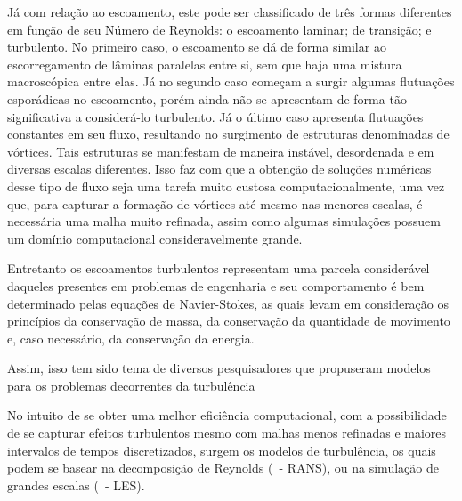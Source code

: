 
Já com relação ao escoamento, este pode ser classificado de três formas diferentes em função de seu Número de Reynolds: o escoamento laminar; de transição; e turbulento. No primeiro caso, o escoamento se dá de forma similar ao escorregamento de lâminas paralelas entre si, sem que haja uma mistura macroscópica entre elas. Já no segundo caso começam a surgir algumas flutuações esporádicas no escoamento, porém ainda não se apresentam de forma tão significativa a considerá-lo turbulento. Já o último caso apresenta flutuações constantes em seu fluxo, resultando no surgimento de estruturas denominadas de vórtices. Tais estruturas se manifestam de maneira instável, desordenada e em diversas escalas diferentes. Isso faz com que a obtenção de soluções numéricas desse tipo de fluxo seja uma tarefa muito custosa computacionalmente, uma vez que, para capturar a formação de vórtices até mesmo nas menores escalas, é necessária uma malha muito refinada, assim como algumas simulações possuem um domínio computacional consideravelmente grande.

Entretanto os escoamentos turbulentos representam uma parcela considerável daqueles presentes em problemas de engenharia e seu comportamento é bem determinado pelas equações de Navier-Stokes, as quais levam em consideração os princípios da conservação de massa, da conservação da quantidade de movimento e, caso necessário, da conservação da energia.


Assim, isso tem sido tema de diversos pesquisadores que propuseram modelos para os problemas decorrentes da turbulência %

No intuito de se obter uma melhor eficiência computacional, com a possibilidade de se capturar efeitos turbulentos mesmo com malhas menos refinadas e maiores intervalos de tempos discretizados, surgem os modelos de turbulência, os quais podem se basear na decomposição de Reynolds (\RANS\ - RANS), ou na simulação de grandes escalas (\LES\ - LES).


